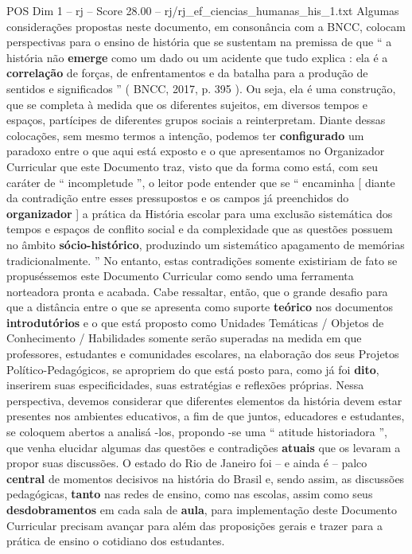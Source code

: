 \begin{textsample}{POS Dim 1 – rj – Score 28.00 – rj/rj\_ef\_ciencias\_humanas\_his\_1.txt}
Algumas considerações propostas neste documento, em consonância com a BNCC, colocam perspectivas para o ensino de história que se sustentam na premissa de que “ a história não \textbf{emerge} como um dado ou um acidente que tudo explica : ela é a \textbf{correlação} de forças, de enfrentamentos e da batalha para a produção de sentidos e significados ” ( BNCC, 2017, p. 395 ).
Ou seja, ela é uma construção, que se completa à medida que os diferentes sujeitos, em diversos tempos e espaços, partícipes de diferentes grupos sociais a reinterpretam.
Diante dessas colocações, sem mesmo termos a intenção, podemos ter \textbf{configurado} um paradoxo entre o que aqui está exposto e o que apresentamos no Organizador Curricular que este Documento traz, visto que da forma como está, com seu caráter de “ incompletude ”, o leitor pode entender que se “ encaminha [ diante da contradição entre esses pressupostos e os campos já preenchidos do \textbf{organizador} ] a prática da História escolar para uma exclusão sistemática dos tempos e espaços de conflito social e da complexidade que as questões possuem no âmbito \textbf{sócio-histórico}, produzindo um sistemático apagamento de memórias tradicionalmente. ” No entanto, estas contradições somente existiriam de fato se propuséssemos este Documento Curricular como sendo uma ferramenta norteadora pronta e acabada.
Cabe ressaltar, então, que o grande desafio para que a distância entre o que se apresenta como suporte \textbf{teórico} nos documentos \textbf{introdutórios} e o que está proposto como Unidades Temáticas / Objetos de Conhecimento / Habilidades somente serão superadas na medida em que professores, estudantes e comunidades escolares, na elaboração dos seus Projetos Político-Pedagógicos, se apropriem do que está posto para, como já foi \textbf{dito}, inserirem suas especificidades, suas estratégias e reflexões próprias.
Nessa perspectiva, devemos considerar que diferentes elementos da história devem estar presentes nos ambientes educativos, a fim de que juntos, educadores e estudantes, se coloquem abertos a analisá -los, propondo -se uma “ atitude historiadora ”, que venha elucidar algumas das questões e contradições \textbf{atuais} que os levaram a propor suas discussões.
O estado do Rio de Janeiro foi – e ainda é – palco \textbf{central} de momentos decisivos na história do Brasil e, sendo assim, as discussões pedagógicas, \textbf{tanto} nas redes de ensino, como nas escolas, assim como seus \textbf{desdobramentos} em cada sala de \textbf{aula}, para implementação deste Documento Curricular precisam avançar para além das proposições gerais e trazer para a prática de ensino o cotidiano dos estudantes.

\end{textsample}
